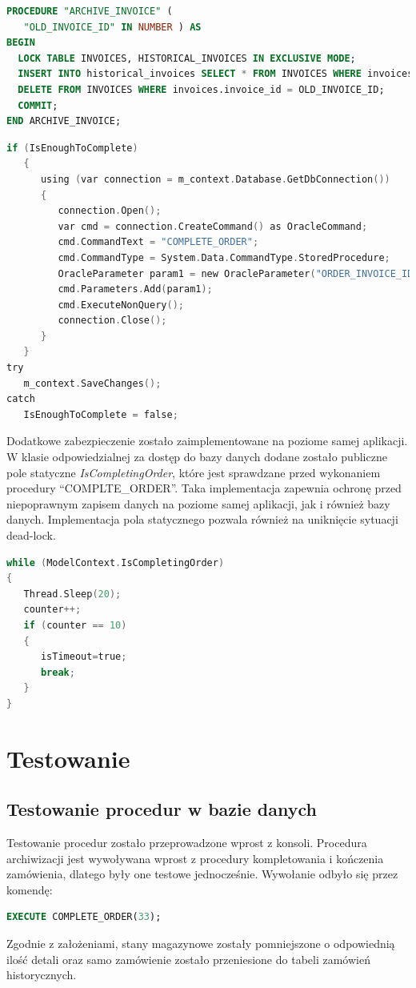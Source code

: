 \documentclass{article}
\begin{document}
\begin{lstlisting}[language=sql, frame=single,tabsize=1,breaklines=true, caption={Procedura ARCHIVE\_INVOICE}]
   PROCEDURE "ARCHIVE_INVOICE" (
   "OLD_INVOICE_ID" IN NUMBER ) AS 
BEGIN
  LOCK TABLE INVOICES, HISTORICAL_INVOICES IN EXCLUSIVE MODE;
  INSERT INTO historical_invoices SELECT * FROM INVOICES WHERE invoices.invoice_id = OLD_INVOICE_ID;
  DELETE FROM INVOICES WHERE invoices.invoice_id = OLD_INVOICE_ID;
  COMMIT;
END ARCHIVE_INVOICE;
\end{lstlisting}
\begin{lstlisting}[language=C, frame=single,tabsize=1,caption={Kod aplikacji wywołujący procedurę COMPLETE\_ORDER}]
if (IsEnoughToComplete)
   {
      using (var connection = m_context.Database.GetDbConnection())
      {
         connection.Open();
         var cmd = connection.CreateCommand() as OracleCommand;
         cmd.CommandText = "COMPLETE_ORDER";
         cmd.CommandType = System.Data.CommandType.StoredProcedure;
         OracleParameter param1 = new OracleParameter("ORDER_INVOICE_ID", InvoiceID);
         cmd.Parameters.Add(param1);
         cmd.ExecuteNonQuery();
         connection.Close();
      }
   }
try
   m_context.SaveChanges();
catch
   IsEnoughToComplete = false;
\end{lstlisting}

Dodatkowe zabezpieczenie zostało zaimplementowane na poziome samej aplikacji. W
klasie odpowiedzialnej za dostęp do bazy danych dodane zostało publiczne pole
statyczne \textit{IsCompletingOrder}, które jest sprawdzane przed wykonaniem
procedury ``COMPLTE\_ORDER''. Taka implementacja zapewnia ochronę przed
niepoprawnym zapisem danych na poziome samej aplikacji, jak i również bazy
danych. Implementacja pola statycznego pozwala również na uniknięcie sytuacji
dead-lock.
\begin{lstlisting}[language=C,frame=single]
while (ModelContext.IsCompletingOrder)
{
   Thread.Sleep(20);
   counter++;
   if (counter == 10)
   {
      isTimeout=true;
      break;
   }
}
\end{lstlisting}

\section{Testowanie}
\subsection{Testowanie procedur w bazie danych}
Testowanie procedur zostało przeprowadzone wprost z konsoli. Procedura
archiwizacji jest wywoływana wprost z procedury kompletowania i kończenia
zamówienia, dlatego były one testowe jednocześnie. Wywołanie odbyło się przez
komendę:
\begin{lstlisting}[language=sql]
   EXECUTE COMPLETE_ORDER(33);
\end{lstlisting}
Zgodnie z założeniami, stany magazynowe zostały pomniejszone o odpowiednią ilość
detali oraz samo zamówienie zostało przeniesione do tabeli zamówień
historycznych.
\end{document}
